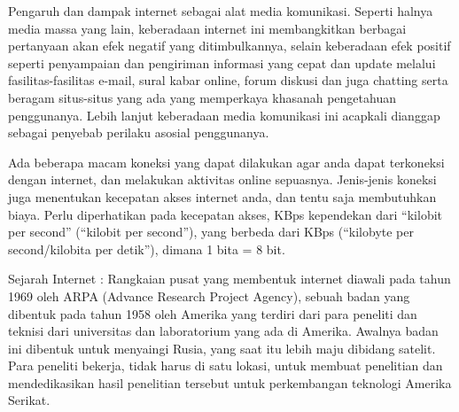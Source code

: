 \documentclass[12pt, a4paper]{article}
\begin{document}
    Pengaruh dan dampak internet sebagai alat media komunikasi. Seperti halnya media massa yang lain, keberadaan internet ini membangkitkan berbagai pertanyaan akan efek negatif yang ditimbulkannya, selain keberadaan efek positif seperti penyampaian dan pengiriman informasi yang cepat dan update melalui fasilitas-fasilitas e-mail, sural kabar online, forum diskusi dan juga chatting serta beragam situs-situs yang ada yang memperkaya khasanah pengetahuan penggunanya. Lebih lanjut keberadaan media komunikasi ini acapkali dianggap sebagai penyebab perilaku asosial penggunanya.

    Ada beberapa macam koneksi yang dapat dilakukan agar anda dapat terkoneksi dengan internet, dan melakukan aktivitas online sepuasnya. Jenis-jenis koneksi juga menentukan kecepatan akses internet anda, dan tentu saja membutuhkan biaya. Perlu diperhatikan pada kecepatan akses, KBps kependekan dari “kilobit per second” (“kilobit per second”), yang berbeda dari KBps (“kilobyte per second/kilobita per detik”), dimana 1 bita = 8 bit.
    
    Sejarah Internet : Rangkaian pusat yang membentuk internet diawali pada tahun 1969 oleh ARPA (Advance Research Project Agency), sebuah badan yang dibentuk pada tahun 1958 oleh Amerika yang terdiri dari para peneliti dan teknisi dari universitas dan laboratorium yang ada di Amerika. Awalnya badan ini dibentuk untuk menyaingi Rusia, yang saat itu lebih maju dibidang satelit. Para peneliti bekerja, tidak harus di satu lokasi, untuk membuat penelitian dan mendedikasikan hasil penelitian tersebut untuk perkembangan teknologi Amerika Serikat.
\end{document}
